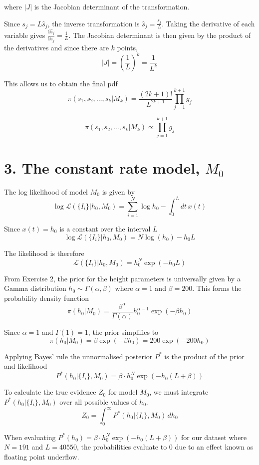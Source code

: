 \documentclass[11pt]{article}
\begin{document}
where $|J|$ is the Jacobian determinant of the transformation. 

Since $s_j = L \hat{s}_j$, the inverse transformation is $\hat{s}_j = \frac{s_j}{L}$. Taking the derivative of each variable gives $\frac{\partial \hat{s}_j}{\partial s_j} = \frac{1}{L}$. The Jacobian determinant is then given by the product of the derivatives and since there are $k$ points,
$$\left| J \right| = \left( \frac{1}{L} \right)^k = \frac{1}{L^k}$$

This allows us to obtain the final pdf
$$\pi(s_1, s_2, \dots, s_k | M_k) = \frac{(2k+1)!}{L^{2k+1}} \prod_{j=1}^{k+1} g_j$$

$$\pi(s_1, s_2, \dots, s_k | M_k) \propto \prod_{j=1}^{k+1} g_j$$

\section*{3. The constant rate model, $M_0$}
The log likelihood of model $M_0$ is given by 
$$\log \mathcal{L}(\{I_i\} | h_0, M_0) = \sum_{i=1}^{N} \log h_0 - \int_{0}^{L} dt \, x(t)$$

Since $x(t) = h_0$ is a constant over the interval $L$ 
$$\log \mathcal{L}(\{I_i\} | h_0, M_0) = N \log(h_0) - h_0 L$$ 

The likelihood is therefore 
$$\mathcal{L}(\{I_i\} | h_0, M_0) = h_0^N \exp(-h_0 L)$$

From Exercise 2, the prior for the height parameters is universally given by a Gamma distribution $h_0 \sim \Gamma(\alpha, \beta)$ where $\alpha=1$ and $\beta=200$. This forms the probability density function
$$ \pi(h_0|M_0) = \frac{\beta^\alpha}{\Gamma(\alpha)} h_0^{\alpha-1} \exp(-\beta h_0) $$ 

Since $\alpha=1$ and $\Gamma(1) = 1$, the prior simplifies to 
$$ \pi(h_0|M_0) = \beta \exp(-\beta h_0) = 200 \exp(-200 h_0) $$

Applying Bayes' rule the unnormalised posterior $P^*$ is the product of the prior and likelihood
$$ P^*(h_0 | \{I_i\}, M_0) = \beta \cdot h_0^N \exp(-h_0(L + \beta)) $$

To calculate the true evidence $Z_0$ for model $M_0$, we must integrate $P^*(h_0 | \{I_i\}, M_0)$ over all possible values of $h_0$.
$$Z_0 = \int_{0}^{\infty} P^*(h_0 | \{I_i\}, M_0) \, dh_0$$

When evaluating $P^*(h_0) = \beta \cdot h_0^N \exp(-h_0(L+\beta))$ for our dataset where $N=191$ and $L=40550$, the probabilities evaluate to 0 due to an effect known as floating point underflow.
\end{document}
